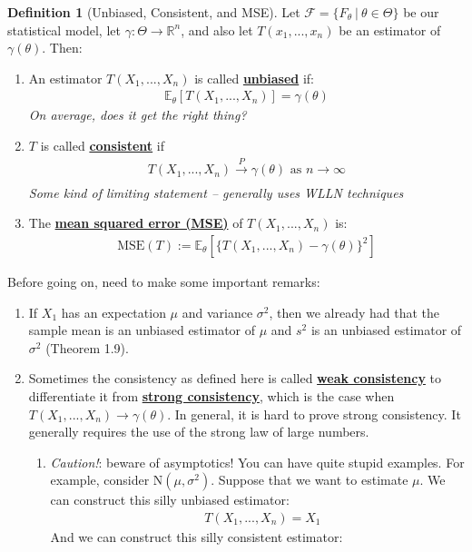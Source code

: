 \documentclass[11pt]{scrartcl}
\newcommand{\R}[0]{\mathbb{R}}
\theoremstyle{definition}
\newtheorem{definition}{Definition}
\theoremstyle{remark}
\newcommand{\dfn}[1]{\textbf{\underline{#1}}}
\newcommand{\dist}[0]{\mathcal{F}}
\newcommand{\stat}[0]{T(X_1, ..., X_n )}
\newcommand{\EXth}[1]{\mathbb{E}_\theta \left[ #1 \right]}
\begin{document}
{\begin{definition}[Unbiased, Consistent, and MSE] Let $\dist = \{ F_\theta\ |\ \theta \in \Theta \}$ be our statistical model, let $\gamma: \Theta \rightarrow \R^n$, and also let $T(x_1, ..., x_n)$ be an estimator of $\gamma (\theta)$. Then: 
\begin{enumerate}[noitemsep]
	\item An estimator $T(X_1, ..., X_n)$ is called \dfn{unbiased} if: 
	\begin{align}
		\EXth{\stat} = \gamma(\theta)
	\end{align}
	\emph{On average, does it get the right thing?} 
	\item $T$ is called \dfn{consistent} if 
	\begin{align}
		\stat \xrightarrow[]{P} \gamma(\theta) \text{ as } n \rightarrow \infty 
	\end{align}
	\emph{Some kind of limiting statement -- generally uses WLLN techniques} 
	\item The \dfn{mean squared error (MSE)} of $\stat$ is: 
	\begin{align}
		\text{MSE}(T):= \EXth{\{ \stat - \gamma(\theta) \}^2}
	\end{align}
\end{enumerate}
\end{definition}
Before going on, need to make some important remarks: 
\begin{enumerate}[noitemsep]
	\item If $X_1$ has an expectation $\mu$ and variance $\sigma^2$, then we already had that the sample mean is an unbiased estimator of $\mu$ and $s^2$ is an unbiased estimator of $\sigma^2$ (Theorem 1.9). 
	\item Sometimes the consistency as defined here is called \dfn{weak consistency} to differentiate it from \dfn{strong consistency}, which is the case when $\stat \rightarrow \gamma(\theta)$. In general, it is hard to prove strong consistency. It generally requires the use of the strong law of large numbers. 
	\begin{enumerate}[noitemsep]
		\item \emph{Caution!}: beware of asymptotics! You can have quite stupid examples. For example, consider N$(\mu, \sigma^2)$. Suppose that we want to estimate $\mu$. We can construct this silly unbiased estimator: 
		\begin{align*}	
			& T(X_1, ..., X_n) = X_1 
		\end{align*}
		And we can construct this silly consistent estimator: 

\end{enumerate}
\end{enumerate}}
\end{document}
